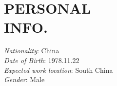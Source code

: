 
\section{PERSONAL\\INFO.}

{\em Nationality}: China\\
{\em Date of Birth}: 1978.11.22\\
{\em Expected work location}: South China\\
{\em Gender}: Male

